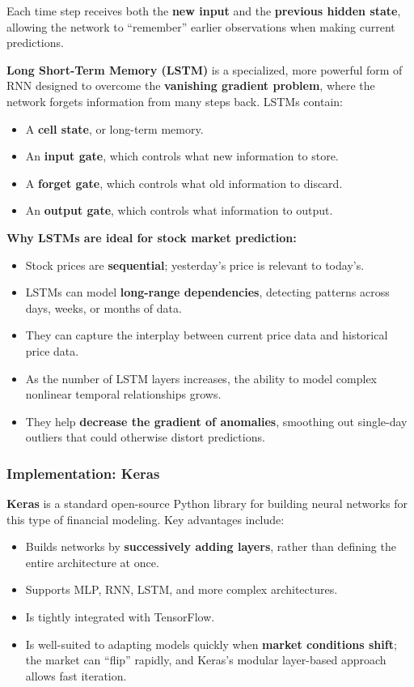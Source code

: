 \documentclass[12pt,openany]{book}
\begin{document}
Each time step receives both the \textbf{new input} and the \textbf{previous hidden state}, allowing the network to ``remember'' earlier observations when making current predictions.

\textbf{Long Short-Term Memory (LSTM)} is a specialized, more powerful form of RNN designed to overcome the \textbf{vanishing gradient problem}, where the network forgets information from many steps back. LSTMs contain:
\begin{itemize}[leftmargin=*]
    \item A \textbf{cell state}, or long-term memory.
    \item An \textbf{input gate}, which controls what new information to store.
    \item A \textbf{forget gate}, which controls what old information to discard.
    \item An \textbf{output gate}, which controls what information to output.
\end{itemize}

\textbf{Why LSTMs are ideal for stock market prediction:}
\begin{itemize}[leftmargin=*]
    \item Stock prices are \textbf{sequential}; yesterday's price is relevant to today's.
    \item LSTMs can model \textbf{long-range dependencies}, detecting patterns across days, weeks, or months of data.
    \item They can capture the interplay between current price data and historical price data.
    \item As the number of LSTM layers increases, the ability to model complex nonlinear temporal relationships grows.
    \item They help \textbf{decrease the gradient of anomalies}, smoothing out single-day outliers that could otherwise distort predictions.
\end{itemize}

\subsubsection{Implementation: Keras}

\textbf{Keras} is a standard open-source Python library for building neural networks for this type of financial modeling. Key advantages include:
\begin{itemize}[leftmargin=*]
    \item Builds networks by \textbf{successively adding layers}, rather than defining the entire architecture at once.
    \item Supports MLP, RNN, LSTM, and more complex architectures.
    \item Is tightly integrated with TensorFlow.
    \item Is well-suited to adapting models quickly when \textbf{market conditions shift}; the market can ``flip'' rapidly, and Keras's modular layer-based approach allows fast iteration.
\end{itemize}
\end{document}
